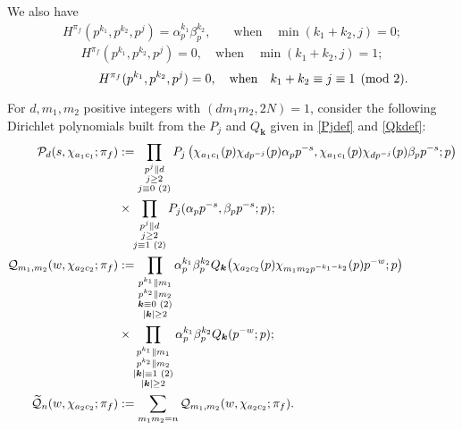 \documentclass[12pt,reqno]{amsart}
\theoremstyle{plain}
\theoremstyle{remark}
\numberwithin{equation}{section}
\numberwithin{lemma}{section}
\numberwithin{theorem}{section}
\numberwithin{prop}{section}
\numberwithin{remark}{section}
\begin{document}
We also have  
 \begin{align}
H^{\pi_f}(p^{k_1},p^{k_2},p^{j})=  \alpha_p^{k_1} 
  \beta_p^{k_2}, & \quad \text{when}  \quad \min(k_1+k_2,j)=0; \label{fact1} 
 \end{align}
 \begin{equation}
H^{\pi_f}(p^{k_1},p^{k_2},p^{j})=0, \quad \text{when}  \quad \min(k_1+k_2,j)=1; \label{fact2}  
\end{equation}
\begin{equation}
\hspace{1.2cm} H^{\pi_f}(p^{k_1},p^{k_2},p^{j})=0, \quad \text{when}  \quad k_1+k_2 \equiv j \equiv 1 \pmod{2}. \label{fact3}
\end{equation}

For $d,m_1,m_2$ positive integers with $(dm_1m_2,2N)=1$,
consider the following Dirichlet polynomials built from the $P_j$ and 
$Q_{\boldsymbol{k}}$ given in \eqref{Pjdef} and \eqref{Qkdef}:
\begin{align} \label{correct1}
 \mathcal{P}_d(s,\chi_{a_1 c_1};\pi_f)&:=
   \prod_{\substack{p^{j} \parallel d \\ j \geq 2 \\ j \equiv 0 \hspace{0.1cm} (2) } }
  P_j \left(\chi_{a_1 c_1}(p) \chi_{dp^{-j}}(p) \alpha_p p^{-s},
 \chi_{a_1 c_1}(p) \chi_{dp^{-j}}(p) \beta_p p^{-s};p \right) \nonumber \\
 & \times \prod_{\substack{p^{j} \parallel d \\ j \geq 2 \\ j \equiv 1 \hspace{0.1cm} (2) } } 
P_j(\alpha_p p^{-s},\beta_p p^{-s};p); \\
\mathcal{Q}_{m_1,m_2}(w,\chi_{a_2 c_2};\pi_f)&:= 
\prod_{\substack{p^{k_1} \parallel m_1  \\ p^{k_2} \parallel m_2  \\ \boldsymbol{k} \equiv 0 \hspace{0.1cm} (2) \\ |\boldsymbol{k}| \geq 2 } } 
 \alpha_p^{k_1} \beta_p^{k_2}  Q_{\boldsymbol{k}} \big(\chi_{a_2 c_2}(p) \chi_{m_1 m_2 p^{-k_1-k_2}}(p) p^{-w};p \big) \nonumber \\
& \times \prod_{\substack{p^{k_1} \parallel m_1  \\ p^{k_2} \parallel m_2  \\ |\boldsymbol{k}| \equiv 1 \hspace{0.1cm}
 (2) \\ |\boldsymbol{k}| \geq 2} } \label{correct2}
\alpha_p^{k_1} \beta_p^{k_2} Q_{\boldsymbol{k}}(p^{-w};p); \\
\widetilde{\mathcal{Q}}_{n}(w,\chi_{a_2 c_2};\pi_f)&:= \sum_{m_1 m_2=n} 
\mathcal{Q}_{m_1,m_2}(w,\chi_{a_2 c_2};\pi_f). \label{correct3}
\end{align}
\end{document}

